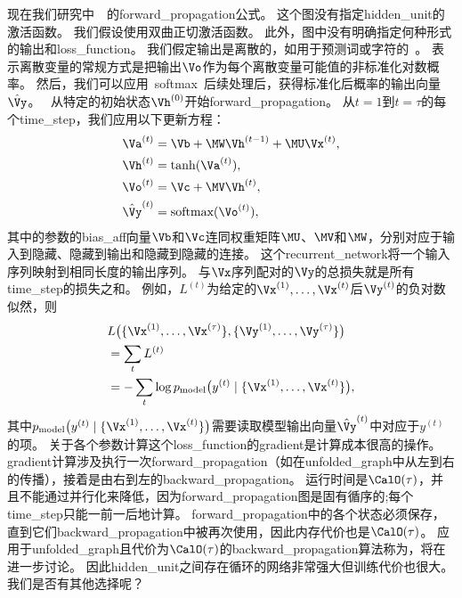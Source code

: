 现在我们研究中~~的\gls{forward_propagation}公式。
这个图没有指定\gls{hidden_unit}的激活函数。
我们假设使用双曲正切激活函数。
此外，图中没有明确指定何种形式的输出和\gls{loss_function}。
我们假定输出是离散的，如用于预测词或字符的~。
表示离散变量的常规方式是把输出$\Vo$作为每个离散变量可能值的非标准化对数概率。
然后，我们可以应用~\gls{softmax}~后续处理后，获得标准化后概率的输出向量$\hat \Vy$。
~从特定的初始状态$\Vh^{(0)}$开始\gls{forward_propagation}。
从$t= 1$到$t = \tau$的每个\gls{time_step}，我们应用以下更新方程：
\begin{align}
\label{eq:108a}
 \Va^{(t)} &= \Vb + \MW \Vh^{(t-1)} + \MU \Vx^{(t)}, \\
  \Vh^{(t)} &= \tanh(\Va^{(t)} ), \\
  \Vo^{(t)} &= \Vc + \MV \Vh^{(t)}, \\
  \hat \Vy^{(t)} &= \text{softmax}(\Vo^{(t)}),
\end{align}
其中的参数的\gls{bias_aff}向量$\Vb$和$\Vc$连同权重矩阵$\MU$、$\MV$和$\MW$，分别对应于输入到隐藏、隐藏到输出和隐藏到隐藏的连接。
这个\gls{recurrent_network}将一个输入序列映射到相同长度的输出序列。
与$\Vx$序列配对的$\Vy$的总损失就是所有\gls{time_step}的损失之和。
例如，$L^{(t)}$为给定的$\Vx^{(1)}, \dots, \Vx^{(t)}$后$\Vy^{(t)}$的负对数似然，则
\begin{align} \label{eq:1012L}
 & L\big( \{ \Vx^{(1)}, \dots, \Vx^{(\tau)} \}, \{ \Vy^{(1)}, \dots, \Vy^{(\tau)}  \} \big) \\
 & = \sum_t L^{(t)} \\
 & = - \sum_t \log p_{\text{model}} \big(  y^{(t)} \mid  \{ \Vx^{(1)}, \dots, \Vx^{(t)} \} \big) ,
\end{align}
其中$p_{\text{model}} \big(  y^{(t)} \mid  \{ \Vx^{(1)}, \dots, \Vx^{(t)} \} \big) $需要读取模型输出向量$\hat \Vy^{(t)}$中对应于$y^{(t)}$的项。
关于各个参数计算这个\gls{loss_function}的\gls{gradient}是计算成本很高的操作。
\gls{gradient}计算涉及执行一次\gls{forward_propagation}（如在\gls{unfolded_graph}中从左到右的传播），接着是由右到左的\gls{backward_propagation}。
运行时间是$\CalO(\tau)$，并且不能通过并行化来降低，因为\gls{forward_propagation}图是固有循序的;每个\gls{time_step}只能一前一后地计算。
\gls{forward_propagation}中的各个状态必须保存，直到它们\gls{backward_propagation}中被再次使用，因此内存代价也是$\CalO(\tau)$。
应用于\gls{unfolded_graph}且代价为$\CalO(\tau)$的\gls{backward_propagation}算法称为，将在进一步讨论。
因此\gls{hidden_unit}之间存在循环的网络非常强大但训练代价也很大。
我们是否有其他选择呢？

